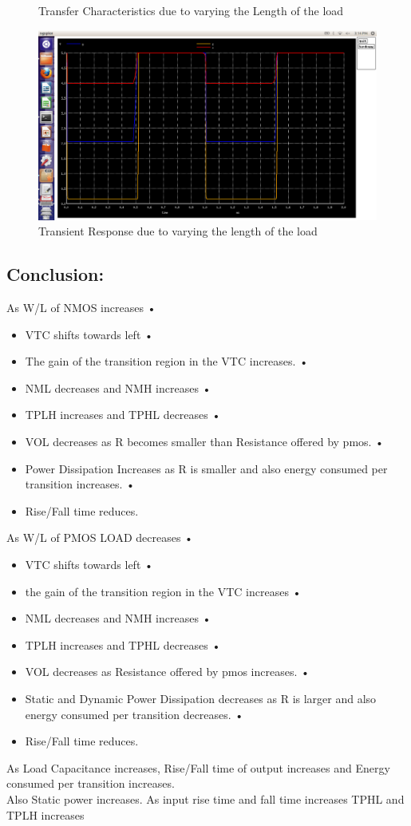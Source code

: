 \documentclass[12pt,a4paper]{article}
\begin{document}
\begin{center}
\begin{figure}[!ht]
\caption[Short]{Transfer Characteristics due to varying the Length of the load}
\end{figure}

\begin{figure}[!ht]
\centering
\includegraphics[scale=0.37]{lab3_pic3_7_transient_duto_varing_Lof_load.png}

\caption[Short]{Transient Response due to varying the length of the load}
\end{figure}
\clearpage
\newpage
\subsection{Conclusion:}
As W/L of NMOS increases • 
\begin{itemize}
\item VTC shifts towards left • 
\item The gain of the transition region in the VTC increases. • 
\item NML decreases and NMH increases • 
\item TPLH increases and TPHL decreases • 
\item VOL decreases as R becomes smaller than Resistance offered by pmos. • 
\item Power Dissipation Increases as R is smaller and also energy consumed per    transition increases. • 
\item Rise/Fall time reduces.
\end{itemize}  
As W/L of PMOS LOAD decreases • 
\begin{itemize}
\item VTC shifts towards left • 
\item the gain of the transition region in the VTC increases • 
\item NML decreases and NMH increases • 
\item TPLH increases and TPHL decreases • 
\item VOL decreases as Resistance offered by pmos increases. • 
\item Static and Dynamic Power Dissipation decreases as R is larger and also energy consumed per transition decreases. • 
\item Rise/Fall time reduces.
\end{itemize}  
As Load Capacitance increases, Rise/Fall time of output increases and Energy consumed per transition increases. 
\\Also Static power increases. As input rise time and fall time increases TPHL and TPLH increases 


\end{center}
\end{document}
